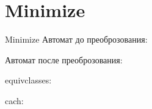 \section{Minimize}
\begin{frame}{Minimize}
	Автомат до преоброзования:


	Автомат после преоброзования:


	equivclasses:


	cach:


\end{frame}


